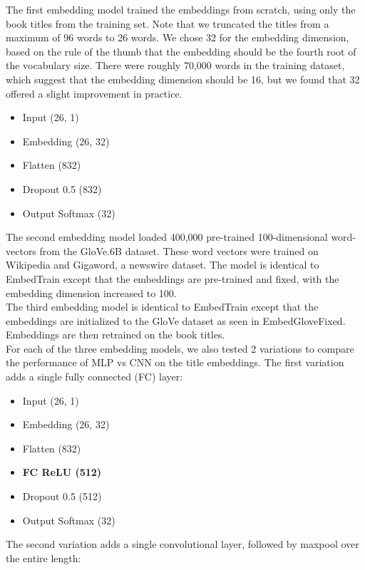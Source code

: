 \documentclass[jou,apacite, 10px]{apa6}
\begin{document}
The first embedding model trained the embeddings from scratch, using only the book titles from the training set. Note that we truncated the titles from a maximum of 96 words to 26 words. We chose 32 for the embedding dimension, based on the rule of the thumb that the embedding should be the fourth root of the vocabulary size. There were roughly 70,000 words in the training dataset, which suggest that the embedding dimension should be 16, but we found that 32 offered a slight improvement in practice.
\begin{itemize}
    \item Input (26, 1)
    \item Embedding (26, 32)
    \item Flatten (832)
    \item Dropout 0.5 (832)
    \item Output Softmax (32)
\end{itemize}

The second embedding model loaded 400,000 pre-trained 100-dimensional word-vectors from the GloVe.6B dataset. These word vectors were trained on Wikipedia and Gigaword, a newswire dataset. The model is identical to EmbedTrain except that the embeddings are pre-trained and fixed, with the embedding dimension increased to 100.\\

The third embedding model is identical to EmbedTrain except that the embeddings are initialized to the GloVe dataset as seen in EmbedGloveFixed. Embeddings are then retrained on the book titles.\\

For each of the three embedding models, we also tested 2 variations to compare the performance of MLP vs CNN on the title embeddings. The first variation adds a single fully connected (FC) layer:

\begin{itemize}
    \item Input (26, 1)
    \item Embedding (26, 32)
    \item Flatten (832)
    \item \textbf{FC ReLU (512)}
    \item Dropout 0.5 (512)
    \item Output Softmax (32)
\end{itemize}

The second variation adds a single convolutional layer, followed by maxpool over the entire length:
\end{document}
